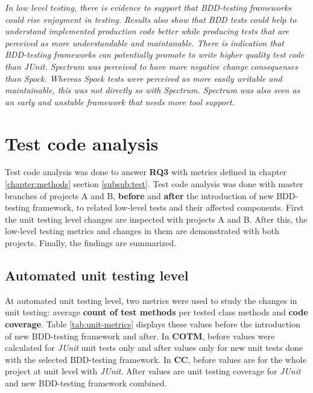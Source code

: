 \begin{topbot}
\textit{In low level testing, there is evidence to support that BDD-testing frameworks could rise enjoyment in testing. Results
also show that BDD tests could help to understand implemented production code better while producing tests that are perceived as more understandable
and maintanable. There is indication that BDD-testing frameworks can potentially promote to write higher quality test
code than JUnit.\newline\newline
Spectrum was perceived to have more negative change consequenses than Spock. Whereas Spock tests were perceived as more easily
writable and maintainable, this was not directly so with Spectrum. Spectrum was also seen as an early and unstable framework
that needs more tool support.}
\end{topbot}

\section{Test code analysis}
Test code analysis was done to answer \textbf{RQ3} with metrics defined in chapter \ref{chapter:methods} section \ref{subsub:test}.
Test code analysis was done with master branches of projects A and B, \textbf{before} and \textbf{after} the introduction of new BDD-testing framework, to related
low-level tests and their affected components. First the unit testing level changes are inspected with projects A and B.
After this, the low-level testing metrics and changes in them are demonstrated with both projects. Finally, the findings are summarized.

\subsection{Automated unit testing level}
\label{subsub:unit-level-metrics}
At automated unit testing level, two metrics were used to study the changes in unit testing: average \textbf{count of test methods}
per tested class methods and \textbf{code coverage}. Table \ref{tab:unit-metrics} displays these values before the introduction
of new BDD-testing framework and after. In \textbf{COTM}, before values were calculated for \textit{JUnit} unit tests only and after
values only for new unit tests done with the selected BDD-testing framework. In \textbf{CC}, before values are for the
whole project at unit level with \textit{JUnit}. After values are unit testing coverage for \textit{JUnit} and new BDD-testing framework
combined.

